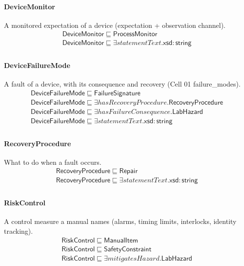 \documentclass[10pt]{article}
\begin{document}
\paragraph{DeviceMonitor} A monitored expectation of a device (expectation + observation channel).
\[\begin{array}{l}
\mathsf{DeviceMonitor} \sqsubseteq  \mathsf{ProcessMonitor} \\
\mathsf{DeviceMonitor} \sqsubseteq  \exists \mathit{statementText}.\mathsf{xsd{:}string} \\
\end{array}\]
\paragraph{DeviceFailureMode} A fault of a device, with its consequence and recovery (Cell 01 failure\_modes).
\[\begin{array}{l}
\mathsf{DeviceFailureMode} \sqsubseteq  \mathsf{FailureSignature} \\
\mathsf{DeviceFailureMode} \sqsubseteq  \exists \mathit{hasRecoveryProcedure}.\mathsf{RecoveryProcedure} \\
\mathsf{DeviceFailureMode} \sqsubseteq  \exists \mathit{hasFailureConsequence}.\mathsf{LabHazard} \\
\mathsf{DeviceFailureMode} \sqsubseteq  \exists \mathit{statementText}.\mathsf{xsd{:}string} \\
\end{array}\]
\paragraph{RecoveryProcedure} What to do when a fault occurs.
\[\begin{array}{l}
\mathsf{RecoveryProcedure} \sqsubseteq  \mathsf{Repair} \\
\mathsf{RecoveryProcedure} \sqsubseteq  \exists \mathit{statementText}.\mathsf{xsd{:}string} \\
\end{array}\]
\paragraph{RiskControl} A control measure a manual names (alarms, timing limits, interlocks, identity tracking).
\[\begin{array}{l}
\mathsf{RiskControl} \sqsubseteq  \mathsf{ManualItem} \\
\mathsf{RiskControl} \sqsubseteq  \mathsf{SafetyConstraint} \\
\mathsf{RiskControl} \sqsubseteq  \exists \mathit{mitigatesHazard}.\mathsf{LabHazard} \\
\end{array}\]
\end{document}
